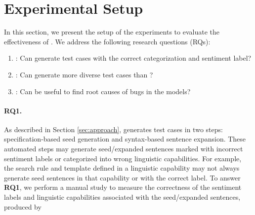 \section{Experimental Setup}
\label{sec:experiment}
%


In this section, we present the setup of the experiments to evaluate the effectiveness
of \tool{}. We address the
following research questions (RQs):


\begin{enumerate}[label=\textbf{RQ\arabic*}]
\item \label{rq:one}: Can \tool generate test cases with the correct \lc categorization and
  sentiment label?
\item \label{rq:two}: Can \tool generate more diverse test cases than \Cklst?
\item \label{rq:three}: Can \tool be useful to find root causes of bugs in the \sa models?
\end{enumerate}




\paragraph{RQ1.} As described in Section \ref{sec:approach}, \tool generates test cases in
two steps: specification-based seed generation and syntax-based sentence expansion. These
automated steps may generate seed/expanded sentences marked with incorrect sentiment labels or categorized into
wrong linguistic capabilities. For example, the search rule and template defined in a linguistic capability
may not always generate seed sentences in that capability or with the correct label.
To answer {\bf RQ1}, we perform a manual study to measure the correctness of the sentiment labels and linguistic capabilities
associated with the seed/expanded sentences, produced by \tool 


